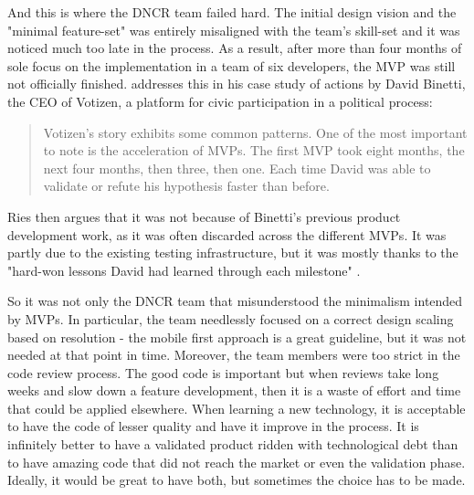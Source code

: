 \documentclass{article}
\begin{document}
And this is where the DNCR team failed hard. The initial design vision and the "minimal feature-set" was entirely misaligned with the team's skill-set and it was noticed much too late in the process. As a result, after more than four months of sole focus on the implementation in a team of six developers, the MVP was still not officially finished. \citet[159]{ries2011lean} addresses this in his case study of actions by David Binetti, the CEO of Votizen, a platform for civic participation in a political process:
\begin{quote}
Votizen's story exhibits some common patterns. One of the most important to note is the acceleration of MVPs. The first MVP took eight months, the next four months, then three, then one. Each time David was able to validate or refute his hypothesis faster than before. 
\end{quote}
Ries then argues that it was not because of Binetti's previous product development work, as it was often discarded across the different MVPs. It was partly due to the existing testing infrastructure, but it was mostly thanks to the "hard-won lessons David had learned through each milestone" \citet[159]{ries2011lean}.

So it was not only the DNCR team that misunderstood the minimalism intended by MVPs. In particular, the team needlessly focused on a correct design scaling based on resolution - the mobile first approach is a great guideline, but it was not needed at that point in time. Moreover, the team members were too strict in the code review process. The good code is important but when reviews take long weeks and slow down a feature development, then it is a waste of effort and time that could be applied elsewhere. When learning a new technology, it is acceptable to have the code of lesser quality and have it improve in the process. It is infinitely better to have a validated product ridden with technological debt than to have amazing code that did not reach the market or even the validation phase. Ideally, it would be great to have both, but sometimes the choice has to be made.
\end{document}
